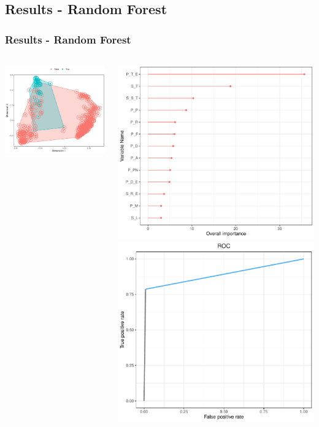 \documentclass[compress]{beamer}
\begin{document}
\subsection{Results - Random Forest}
\begin{frame}
\frametitle{Results - Random Forest}
\begin{columns}
\begin{center}
\includegraphics[width=\linewidth]{Pic/Proximity_Random_forest.pdf}
\end{center}
\begin{center}
\includegraphics[width=0.6\linewidth]{Pic/Random_forest_importance.pdf}
\includegraphics[width=0.6\linewidth]{Pic/Random_Forest_FINAL_ROC.pdf}\\

\end{center}
\end{columns}
\end{frame}
\end{document}
